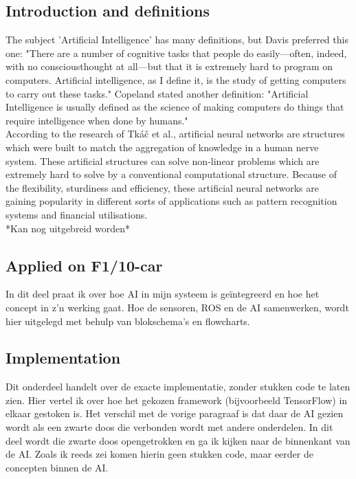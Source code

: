 \documentclass[conference,a4paper]{IEEEtran}
\begin{document}
\subsection{Introduction and definitions}
The subject 'Artificial Intelligence' has many definitions, but Davis preferred this one: "There are a number of cognitive tasks that people do easily---often, indeed, with no consciousthought at all---but that it is extremely hard to program on computers. Artificial intelligence, as I define it, is the study of getting computers to carry out these tasks."\cite{Davis2014} Copeland stated another definition: "Artificial Intelligence is usually defined as the science of making computers do things that require intelligence when done by humans." \cite{Cop2000}\\

According to the research of Tk{\'{a}}{\v{c}} et al.\cite{Tkac2015}, artificial neural networks are structures which were built to match the aggregation of knowledge in a human nerve system. These artificial structures can solve non-linear problems which are extremely hard to solve by a conventional computational structure. Because of the flexibility, sturdiness and efficiency, these artificial neural networks are gaining popularity in different sorts of applications such as pattern recognition systems and financial utilisations.\cite{yegnanarayana2009artificial,Tkac2015}\\

*Kan nog uitgebreid worden*

\subsection{Applied on F1/10-car}
In dit deel praat ik over hoe AI in mijn systeem is ge\"{i}ntegreerd en hoe het concept in z'n werking gaat. Hoe de sensoren, ROS en de AI samenwerken, wordt hier uitgelegd met behulp van blokschema's en flowcharts. 

\subsection{Implementation}
Dit onderdeel handelt over de exacte implementatie, zonder stukken code te laten zien. Hier vertel ik over hoe het gekozen framework (bijvoorbeeld TensorFlow) in elkaar gestoken is. Het verschil met de vorige paragraaf is dat daar de AI gezien wordt als een zwarte doos die verbonden wordt met andere onderdelen. In dit deel wordt die zwarte doos opengetrokken en ga ik kijken naar de binnenkant van de AI. Zoals ik reeds zei komen hierin geen stukken code, maar eerder de concepten binnen de AI.
\end{document}
